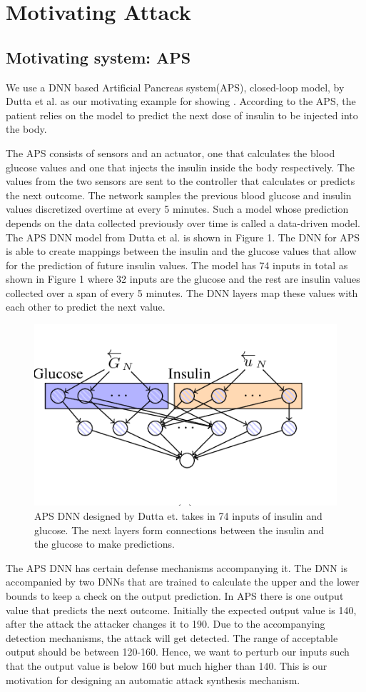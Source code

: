 \chapter{Motivating Attack}
\label{ch:Chapter2}
\section{Motivating system: APS}
We use a DNN based Artificial Pancreas system(APS), closed-loop model, by Dutta et al. \cite{10.1007/978-3-319-99429-1_11}  as our motivating example for showing \attack. According to the APS, the patient relies on the model to predict the next dose of insulin to be injected into the body. 

The APS consists of sensors and an actuator, one that calculates the blood glucose values and one that injects the insulin inside the body respectively. The values from the two sensors are sent to the controller that calculates or predicts the next outcome. The network samples the previous blood glucose and insulin values discretized overtime at every 5 minutes. Such a model whose prediction depends on the data collected previously over time is called a data-driven model. The APS DNN model from Dutta et al. is shown in Figure 1. The DNN for APS is able to create mappings between the insulin and the glucose values that allow for the prediction of future insulin values. The model has 74 inputs in total as shown in Figure 1 where 32 inputs are the glucose and the rest are insulin values collected over a span of every 5 minutes. The DNN layers map these values with each other to predict the next value. 
\begin{figure}
	\centering
	\includegraphics[width=0.7\linewidth, height=0.3\linewidth]{Images/APSDNN}
	\caption[APS DNN]{APS DNN designed by Dutta et. takes in 74 inputs of insulin and glucose. The next layers form connections between the insulin and the glucose to make predictions.}
	\label{fig:apsdnn}
\end{figure}

The APS DNN has certain defense mechanisms accompanying it. The DNN is accompanied by two DNNs that are trained to calculate the upper and the lower bounds to keep a check on the output prediction. In APS there is one output value that predicts the next outcome. Initially the expected output value is 140, after the attack the attacker changes it to 190. Due to the accompanying detection mechanisms, the attack will get detected. The range of acceptable output should be between 120-160. Hence, we want to perturb our inputs such that the output value is below 160 but much higher than 140. This is our motivation for designing an automatic attack synthesis mechanism. 

